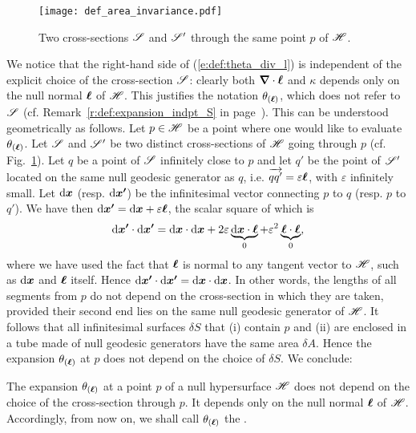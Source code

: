 \begin{figure}
\centerline{\texttt{[image: def\_area\_invariance.pdf]}}
\caption[]{\label{f:def:two_cross_sections} \footnotesize
Two cross-sections $\mathscr{S}$ and $\mathscr{S}'$ through the same point $p$ of $\mathscr{H}$.}
\end{figure}



We notice that the right-hand side of (\ref{e:def:theta_div_l}) is independent of the
explicit choice of the cross-section $\mathscr{S}$: clearly both $\bm{\nabla}\cdot\bm{\ell}$
and $\kappa$ depends only on the null normal $\bm{\ell}$ of $\mathscr{H}$. This justifies
the notation $\theta_{(\bm{\ell})}$, which does not refer to $\mathscr{S}$
(cf. Remark~\ref{r:def:expansion_indpt_S} in page~\pageref{r:def:expansion_indpt_S}).
This can be understood geometrically as follows. Let $p\in\mathscr{H}$ be a
point where one would like to evaluate $\theta_{(\bm{\ell})}$. Let $\mathscr{S}$ and $\mathscr{S}'$
be two distinct cross-sections of $\mathscr{H}$ going through $p$
(cf. Fig.~\ref{f:def:two_cross_sections}). Let $q$ be a point of $\mathscr{S}$ infinitely close to $p$ and let $q'$
be the point of $\mathscr{S}'$ located on the same null geodesic generator as $q$,
i.e. $\overrightarrow{qq'} = \varepsilon \bm{\ell}$, with $\varepsilon$ infinitely small.
Let $\mathrm{d}\bm{x}$ (resp. $\mathrm{d}\bm{x'}$) be the infinitesimal vector connecting
$p$ to $q$ (resp. $p$ to $q'$). We have then
$\mathrm{d}\bm{x'} = \mathrm{d}\bm{x} + \varepsilon \bm{\ell}$,
the scalar square of which is
\[
    \mathrm{d}\bm{x'}\cdot\mathrm{d}\bm{x'} =\mathrm{d}\bm{x}\cdot\mathrm{d}\bm{x}
            + 2 \varepsilon \underbrace{\mathrm{d}\bm{x}\cdot \bm{\ell}}_{0}
            + \varepsilon^2 \underbrace{\bm{\ell}\cdot \bm{\ell}}_{0},
\]
where we have used the fact that $\bm{\ell}$ is normal to any tangent vector to $\mathscr{H}$,
such as $\mathrm{d}\bm{x}$ and $\bm{\ell}$ itself. Hence
$\mathrm{d}\bm{x'}\cdot\mathrm{d}\bm{x'} = \mathrm{d}\bm{x}\cdot\mathrm{d}\bm{x}$.
In other words, the lengths of all segments from $p$ do not depend
on the cross-section in which they are taken, provided their second end
lies on the same null geodesic generator of $\mathscr{H}$. It follows that all infinitesimal surfaces
$\delta S$ that (i) contain $p$ and (ii) are enclosed in a tube made of null geodesic generators have the same
area $\delta A$. Hence the expansion $\theta_{(\bm{\ell})}$ at $p$
does not depend on the choice of $\delta S$.
We conclude:
\begin{prop}
\label{p:def:expansion_indep_cs}
The expansion $\theta_{(\bm{\ell})}$ at a point $p$ of a null hypersurface $\mathscr{H}$
does not depend on the choice of the cross-section through $p$.
It depends  only on the null normal $\bm{\ell}$ of $\mathscr{H}$.
Accordingly, from now on, we shall call $\theta_{(\bm{\ell})}$
the .
\end{prop}

